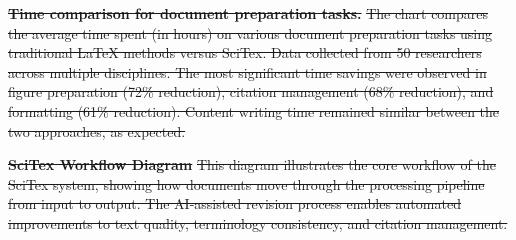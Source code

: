 \documentclass[preprint,review,12pt]{elsarticle}%
\providecommand{\DIFdeltex}[1]{{\protect\color{red}\sout{#1}}}                      %
\providecommand{\DIFdelbegin}{} %
\providecommand{\DIFdelend}{} %
\providecommand{\DIFdelFL}[1]{\DIFdel{#1}} %
\providecommand{\DIFaddbeginFL}{} %
\providecommand{\DIFaddendFL}{} %
\providecommand{\DIFdelbeginFL}{} %
\providecommand{\DIFdelendFL}{} %
\providecommand{\DIFdel}[1]{\texorpdfstring{\DIFdeltex{#1}}{}} %
\newcommand{\DIFscaledelfig}{0.5}
\newlength{\DIFdelgraphicswidth} %
\newlength{\DIFdelgraphicsheight} %
\newcommand{\DIFaddincludegraphics}[2][]{{\color{blue}\fbox{\DIFOincludegraphics[#1]{#2}}}} %
\newcommand{\DIFdelincludegraphics}[2][]{%
\sbox{\DIFdelgraphicsbox}{\DIFOincludegraphics[#1]{#2}}%
\settoboxwidth{\DIFdelgraphicswidth}{\DIFdelgraphicsbox} %
\settoboxtotalheight{\DIFdelgraphicsheight}{\DIFdelgraphicsbox} %
\scalebox{\DIFscaledelfig}{%
\parbox[b]{\DIFdelgraphicswidth}{\usebox{\DIFdelgraphicsbox}\\[-\baselineskip] \rule{\DIFdelgraphicswidth}{0em}}\llap{\resizebox{\DIFdelgraphicswidth}{\DIFdelgraphicsheight}{%
\setlength{\unitlength}{\DIFdelgraphicswidth}%
\begin{picture}(1,1)%
\thicklines\linethickness{2pt} %
{\color[rgb]{1,0,0}\put(0,0){\framebox(1,1){}}}%
{\color[rgb]{1,0,0}\put(0,0){\line( 1,1){1}}}%
{\color[rgb]{1,0,0}\put(0,1){\line(1,-1){1}}}%
\end{picture}%
}\hspace*{3pt}}} %
} %
\DeclareRobustCommand{\DIFdelbegin}{\DIFOdelbegin \let\includegraphics\DIFdelincludegraphics} %
\DeclareRobustCommand{\DIFdelend}{\DIFOaddend \let\includegraphics\DIFOincludegraphics} %
\DeclareRobustCommand{\DIFaddbeginFL}{\DIFOaddbeginFL \let\includegraphics\DIFaddincludegraphics} %
\DeclareRobustCommand{\DIFaddendFL}{\DIFOaddendFL \let\includegraphics\DIFOincludegraphics} %
\DeclareRobustCommand{\DIFdelbeginFL}{\DIFOdelbeginFL \let\includegraphics\DIFdelincludegraphics} %
\DeclareRobustCommand{\DIFdelendFL}{\DIFOaddendFL \let\includegraphics\DIFOincludegraphics} %
\begin{document}
\begin{frontmatter}
{%
\textbf{\DIFdelFL{Time comparison for document preparation tasks.}} %
\DIFdelFL{The chart compares the average time spent (in hours) on various document preparation tasks using traditional LaTeX methods versus SciTex. Data collected from 50 researchers across multiple disciplines. The most significant time savings were observed in figure preparation (72\% reduction), citation management (68\% reduction), and formatting (61\% reduction). Content writing time remained similar between the two approaches, as expected.}}


{%
\textbf{\DIFdelFL{SciTex Workflow Diagram
}}
\DIFdelFL{This diagram illustrates the core workflow of the SciTex system, showing how documents move through the processing pipeline from input to output. The AI-assisted revision process enables automated improvements to text quality, terminology consistency, and citation management.
}}
\DIFdelendFL %

        	\DIFdelbeginFL %
\DIFdelend %
\clearpage
\DIFdelbegin %
\DIFdelendFL \DIFaddbeginFL \begin{figure*}[p]
    \DIFaddendFL \centering
\DIFdelbeginFL %


\end{figure*}
\end{frontmatter}
\end{document}
